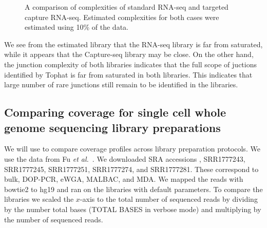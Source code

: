 \documentclass[11pt, titlepage]{article}
\begin{document}
\begin{figure}[h!]
\caption{A comparison of complexities of standard RNA-seq and 
targeted capture RNA-seq.  Estimated complexities for both cases were 
estimated using 10\% of the data.}
\end{figure}

We see from the estimated library that the RNA-seq library is far
from saturated, while it appears that the Capture-seq library
may be close.  On the other hand, the junction complexity of
both libraries indicates that the full scope of juctions identified
by Tophat is far from saturated in both libraries.  This indicates
that large number of rare junctions still remain to be identified
in the libraries.


\newpage

\subsection*{Comparing coverage for single cell whole genome sequencing library preparations}

We will use  to compare coverage profiles
across library preparation protocols.  We use the data
from Fu {\em et al.}~\cite{fu2015uniform}.  
We downloaded SRA accessions , 
SRR1777243, SRR1777245, SRR1777251, 
SRR1777274, and SRR1777281.
These correspond to bulk, DOP-PCR,
eWGA, MALBAC, and MDA.
We mapped the reads with bowtie2 to hg19
and ran  on the libraries with default
parameters.  To compare the libraries we scaled 
the $x$-axis to the total number of sequenced
reads by dividing by the number total bases
(TOTAL BASES in verbose mode) and multiplying
by the number of sequenced reads.
\end{document}
